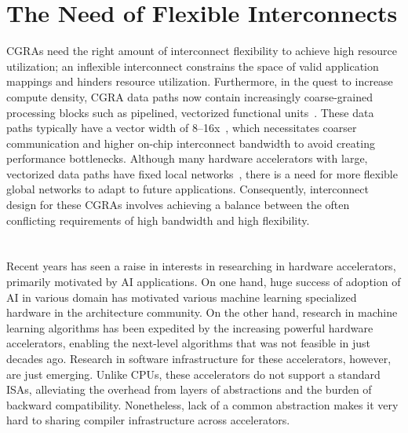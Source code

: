 \section{The Need of Flexible Interconnects}
CGRAs need the right amount of interconnect flexibility to achieve high resource utilization; an inflexible interconnect constrains the space of
valid application mappings and hinders resource utilization. Furthermore, in the quest to increase compute density, CGRA data paths now 
contain increasingly coarse-grained processing blocks such as pipelined, vectorized functional units~\cite{plasticine, piperench, xilinx-acap}.
These data paths typically have a vector width of 8--16x~\cite{plasticine}, which necessitates coarser communication and higher on-chip interconnect bandwidth to avoid
creating performance bottlenecks. 
Although many hardware accelerators with large, vectorized data paths have fixed local networks~\cite{brainwave}, there is a need for more
flexible global networks to adapt to future applications.
Consequently, interconnect design for these CGRAs involves achieving a balance between the often conflicting requirements of high bandwidth and high flexibility.

\section{}
Recent years has seen a raise in interests in researching in hardware accelerators, primarily
motivated by AI applications. 
On one hand, huge success of adoption of AI in various domain has motivated various machine learning
specialized hardware in the architecture community.
On the other hand, research in machine learning algorithms has been expedited by the increasing
powerful hardware accelerators, enabling the next-level algorithms that was not feasible in just
decades ago.
Research in software infrastructure for these accelerators, however, are just emerging.
Unlike CPUs, these accelerators do not support a standard ISAs, alleviating the overhead from
layers of abstractions and the burden of backward compatibility. 
Nonetheless, lack of a common abstraction makes it very hard to sharing compiler infrastructure
across accelerators. 
